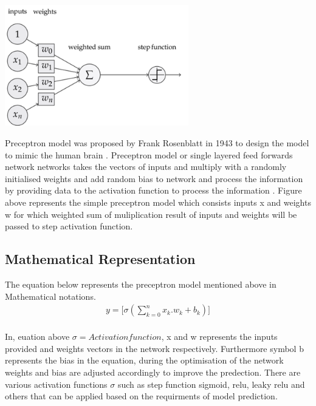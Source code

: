 
\begin{center}
    \includegraphics[width=0.6\textwidth]{Images/p_model.png} \\
\end{center}
\vspace{2mm}
Preceptron model was proposed by Frank Rosenblatt in 1943 to design the model to 
mimic the human brain \citep*{939589}. Preceptron model or single layered feed forwards network 
networks takes the vectors of inputs and multiply with a randomly 
initialised weights and add random bias to network and process the information by providing data to the
activation function to process the information \citep*{AGATONOVICKUSTRIN2000717}.
Figure above represents the simple preceptron model which consists inputs x and weights w 
for which weighted sum of muliplication result of 
inputs and weights will be passed to step activation function.

\subsection{Mathematical Representation }
\vspace{3mm}
{The equation below represents the preceptron model mentioned above in Mathematical notations.}
\begin{equation}
    \begin{split}
        y = \Big[\sigma(\sum_{k=0}^n x_k.w_k + b_k)\Big] \\
    \end{split}
\end{equation}

     {
        In, euation above ${\sigma = Activation function}$, x and w represents the inputs provided 
        and weights vectors in the network respectively. Furthermore symbol b represents the  bias in the equation, 
        during the optimisation of the network weights and bias are adjusted accordingly to improve the 
        predection. There are various activation functions ${\sigma}$ such as  step function sigmoid, 
        relu, leaky relu and others that can be applied based on the requirments of model prediction.
    }